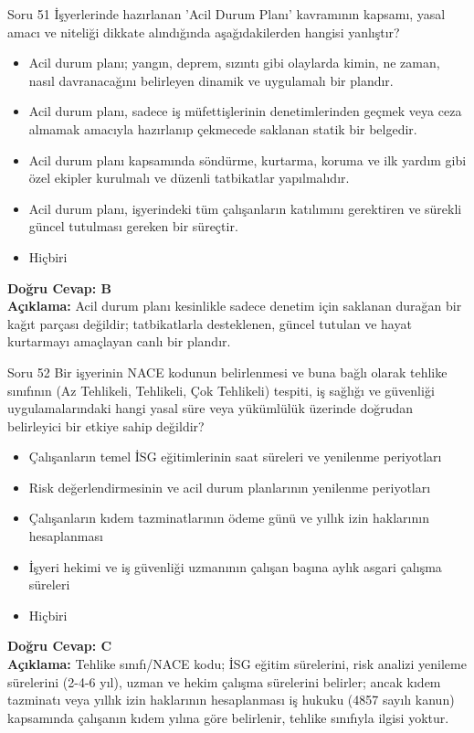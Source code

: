 \documentclass[12pt,a4paper]{article}
\begin{document}
\begin{testcard}{Soru 51}
    İşyerlerinde hazırlanan 'Acil Durum Planı' kavramının kapsamı, yasal amacı ve niteliği dikkate alındığında aşağıdakilerden hangisi yanlıştır?
    \begin{itemize}
        \item[A)] Acil durum planı; yangın, deprem, sızıntı gibi olaylarda kimin, ne zaman, nasıl davranacağını belirleyen dinamik ve uygulamalı bir plandır.
        \item[B)] Acil durum planı, sadece iş müfettişlerinin denetimlerinden geçmek veya ceza almamak amacıyla hazırlanıp çekmecede saklanan statik bir belgedir.
        \item[C)] Acil durum planı kapsamında söndürme, kurtarma, koruma ve ilk yardım gibi özel ekipler kurulmalı ve düzenli tatbikatlar yapılmalıdır.
        \item[D)] Acil durum planı, işyerindeki tüm çalışanların katılımını gerektiren ve sürekli güncel tutulması gereken bir süreçtir.
        \item[E)] Hiçbiri
    \end{itemize}
    \tcblower
    \textbf{Doğru Cevap: B} \\
    \textbf{Açıklama:} Acil durum planı kesinlikle sadece denetim için saklanan durağan bir kağıt parçası değildir; tatbikatlarla desteklenen, güncel tutulan ve hayat kurtarmayı amaçlayan canlı bir plandır.
\end{testcard}

\begin{testcard}{Soru 52}
    Bir işyerinin NACE kodunun belirlenmesi ve buna bağlı olarak tehlike sınıfının (Az Tehlikeli, Tehlikeli, Çok Tehlikeli) tespiti, iş sağlığı ve güvenliği uygulamalarındaki hangi yasal süre veya yükümlülük üzerinde doğrudan belirleyici bir etkiye sahip değildir?
    \begin{itemize}
        \item[A)] Çalışanların temel İSG eğitimlerinin saat süreleri ve yenilenme periyotları
        \item[B)] Risk değerlendirmesinin ve acil durum planlarının yenilenme periyotları
        \item[C)] Çalışanların kıdem tazminatlarının ödeme günü ve yıllık izin haklarının hesaplanması
        \item[D)] İşyeri hekimi ve iş güvenliği uzmanının çalışan başına aylık asgari çalışma süreleri
        \item[E)] Hiçbiri
    \end{itemize}
    \tcblower
    \textbf{Doğru Cevap: C} \\
    \textbf{Açıklama:} Tehlike sınıfı/NACE kodu; İSG eğitim sürelerini, risk analizi yenileme sürelerini (2-4-6 yıl), uzman ve hekim çalışma sürelerini belirler; ancak kıdem tazminatı veya yıllık izin haklarının hesaplanması iş hukuku (4857 sayılı kanun) kapsamında çalışanın kıdem yılına göre belirlenir, tehlike sınıfıyla ilgisi yoktur.
\end{testcard}
\end{document}
